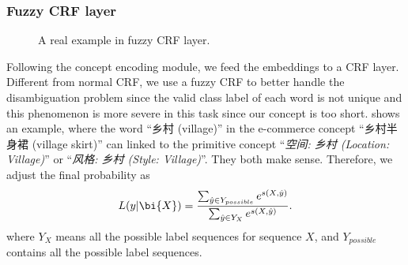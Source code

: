 \subsubsection{Fuzzy CRF layer}

\begin{figure}[th]
	\centering
	\caption{A real example in fuzzy CRF layer.}
	\label{fig:fuzzy}
\end{figure}

Following the concept encoding module, 
we feed the embeddings to a CRF layer.
Different from normal CRF,
we use a fuzzy CRF \cite{shang2018learning} to better handle the disambiguation problem since the valid class label of each word is not unique and this phenomenon is more severe in this task since our concept is too short.
 shows an example, where 
the word ``乡村 (village)'' in the e-commerce concept ``乡村半身裙 (village skirt)'' can linked to the primitive concept ``\textit{空间: 乡村 (Location: Village)}'' or ``\textit{风格: 乡村 (Style: Village)}''.
They both make sense.
Therefore, we adjust the final probability 
as 
\begin{equation}
L(y|\bi{X}) = \frac{\sum_{\hat y \in Y_{possible}}e^{s(X, \hat y)}} {\sum_{\hat y \in Y_{X}}e^{s(X, \hat y)}}.
\end{equation}
where $Y_{X}$ means all the possible label sequences for sequence $X$, and $Y_{possible}$ contains all the possible label sequences.






